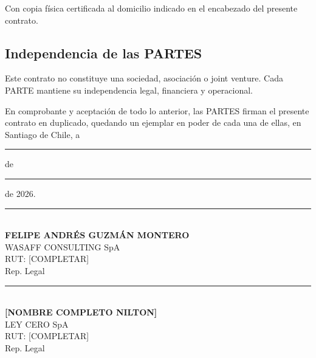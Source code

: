 \documentclass[11pt,letterpaper]{article}
\begin{document}
Con copia física certificada al domicilio indicado en el encabezado del presente contrato.

\subsection{Independencia de las PARTES}

Este contrato no constituye una sociedad, asociación o joint venture. Cada PARTE mantiene su independencia legal, financiera y operacional.


\vspace{1cm}

En comprobante y aceptación de todo lo anterior, las PARTES firman el presente contrato en duplicado, quedando un ejemplar en poder de cada una de ellas, en Santiago de Chile, a \rule{2cm}{0.15mm} de \rule{3cm}{0.15mm} de 2026.

\vspace{2cm}

\begin{minipage}{0.45\textwidth}
\centering
\rule{6cm}{0.4pt}\\
\textbf{FELIPE ANDRÉS GUZMÁN MONTERO}\\
WASAFF CONSULTING SpA\\
RUT: [COMPLETAR]\\
Rep. Legal
\end{minipage}%
\hfill
\begin{minipage}{0.45\textwidth}
\centering
\rule{6cm}{0.4pt}\\
\textbf{[NOMBRE COMPLETO NILTON]}\\
LEY CERO SpA\\
RUT: [COMPLETAR]\\
Rep. Legal
\end{minipage}
\end{document}
